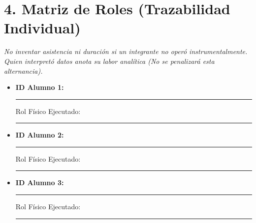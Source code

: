 \documentclass[11pt, a4paper]{article}
\begin{document}
\section*{4. Matriz de Roles (Trazabilidad Individual)}
\textit{No inventar asistencia ni duración si un integrante no operó instrumentalmente. Quien interpretó datos anota su labor analítica (No se penalizará esta alternancia).}
\begin{itemize}
    \item \textbf{ID Alumno 1:} \rule{3cm}{0.4pt} \quad Rol Físico Ejecutado: \rule{6.5cm}{0.4pt}
    \item \textbf{ID Alumno 2:} \rule{3cm}{0.4pt} \quad Rol Físico Ejecutado: \rule{6.5cm}{0.4pt}
    \item \textbf{ID Alumno 3:} \rule{3cm}{0.4pt} \quad Rol Físico Ejecutado: \rule{6.5cm}{0.4pt}
\end{itemize}
\end{document}
